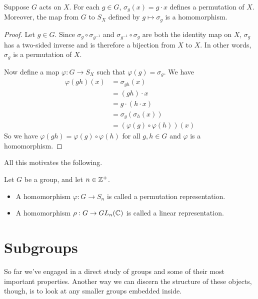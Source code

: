 \documentclass[../m171main.tex]{subfiles}
\begin{document}

\begin{theorem}[]
    Suppose $G$ acts on $X$.
    For each $g \in G$, $\sigma_g(x) = g \cdot x$ defines a permutation of $X$.
    Moreover, the map from $G$ to $S_X$ defined by $g \mapsto \sigma_g$ is a homomorphism.
\end{theorem}

\begin{proof}
    Let $g \in G$.
    Since $\sigma_g \circ \sigma_{g^{-1}}$ and $\sigma_{g^{-1}} \circ \sigma_g$ are both the identity map on $X$, $\sigma_g$ has a two-sided inverse and is therefore a bijection from $X$ to $X$.
    In other words, $\sigma_g$ is a permutation of $X$.     %

    Now define a map $\varphi : G \to S_X$ such that $\varphi(g) = \sigma_g$.
    We have
    \begin{align*}
        \varphi(gh) (x) &= \sigma_{gh}(x) \\
        &= (gh) \cdot x \\
        &= g \cdot (h \cdot x) \\
        &= \sigma_g (\sigma_h (x)) \\
        &= \left( \varphi(g) \circ \varphi(h) \right)(x)
    \end{align*}
    So we have $\varphi(gh) = \varphi(g) \circ \varphi(h)$ for all $g,h \in G$ and $\varphi$ is a homomorphism.
\end{proof}


All this motivates the following.

\begin{definition}[Representation]
    Let $G$ be a group, and let $n \in \mathbb{Z}^+$.
    \begin{itemize}
        \item A homomorphism $\varphi : G \to S_n$ is called a permutation representation.
        \item A homomorphism $\rho : G \to GL_n(\mathbb{C})$ is called a linear representation.
    \end{itemize}
\end{definition}

\section{Subgroups}
So far we've engaged in a direct study of groups and some of their most important properties.
Another way we can discern the structure of these objects, though, is to look at any smaller groups embedded inside.
\end{document}
